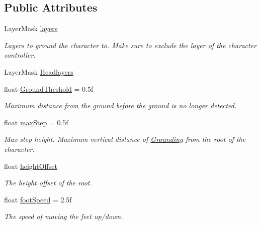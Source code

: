 \subsection*{Public Attributes}
\begin{DoxyCompactItemize}
\item 
Layer\+Mask \mbox{\hyperlink{class_root_motion_1_1_final_i_k_1_1_grounding_adb4ed618467c6bf9e5f1281e03fe77ab}{layers}}
\begin{DoxyCompactList}\small\item\em Layers to ground the character to. Make sure to exclude the layer of the character controller. \end{DoxyCompactList}\item 
Layer\+Mask \mbox{\hyperlink{class_root_motion_1_1_final_i_k_1_1_grounding_a3250efc7d29687a696d77c329c2f2fe4}{Headlayers}}
\item 
float \mbox{\hyperlink{class_root_motion_1_1_final_i_k_1_1_grounding_ac65163d84ce572e6954c3472a136d86a}{Ground\+Theshold}} = 0.\+5f
\begin{DoxyCompactList}\small\item\em Maximum distance from the ground before the ground is no longer detected. \end{DoxyCompactList}\item 
float \mbox{\hyperlink{class_root_motion_1_1_final_i_k_1_1_grounding_afd0474d3135209cf53d00c019933e2a2}{max\+Step}} = 0.\+5f
\begin{DoxyCompactList}\small\item\em Max step height. Maximum vertical distance of \mbox{\hyperlink{class_root_motion_1_1_final_i_k_1_1_grounding}{Grounding}} from the root of the character. \end{DoxyCompactList}\item 
float \mbox{\hyperlink{class_root_motion_1_1_final_i_k_1_1_grounding_ab0945c18f8a705bfc1f68c7c3e7ed53e}{height\+Offset}}
\begin{DoxyCompactList}\small\item\em The height offset of the root. \end{DoxyCompactList}\item 
float \mbox{\hyperlink{class_root_motion_1_1_final_i_k_1_1_grounding_adc74517ebf27f644316a39be8e22402b}{foot\+Speed}} = 2.\+5f
\begin{DoxyCompactList}\small\item\em The speed of moving the feet up/down. \end{DoxyCompactList}\item 

\end{DoxyCompactItemize}
